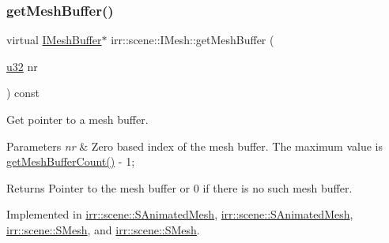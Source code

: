 \mbox{\label{classirr_1_1scene_1_1IMesh_a2cd1a04b396235101f426befba0c5b82}} 
\subsubsection{\texorpdfstring{get\+Mesh\+Buffer()}{getMeshBuffer()}\hspace{0.1cm}{\footnotesize\ttfamily [1/4]}}
{\footnotesize\ttfamily virtual \hyperlink{classirr_1_1scene_1_1IMeshBuffer}{I\+Mesh\+Buffer}$\ast$ irr\+::scene\+::\+I\+Mesh\+::get\+Mesh\+Buffer (\begin{DoxyParamCaption}\item[{\hyperlink{namespaceirr_a0416a53257075833e7002efd0a18e804}{u32}}]{nr }\end{DoxyParamCaption}) const\hspace{0.3cm}{\ttfamily [pure virtual]}}



Get pointer to a mesh buffer. 


\begin{DoxyParams}{Parameters}
{\em nr} & Zero based index of the mesh buffer. The maximum value is \hyperlink{classirr_1_1scene_1_1IMesh_a2ebed0bdae2d6537c36b0b7ac831edb8}{get\+Mesh\+Buffer\+Count()} -\/ 1; \\
\hline
\end{DoxyParams}
\begin{DoxyReturn}{Returns}
Pointer to the mesh buffer or 0 if there is no such mesh buffer. 
\end{DoxyReturn}


Implemented in \hyperlink{structirr_1_1scene_1_1SAnimatedMesh_ac186898d77ded042569a27609195d263}{irr\+::scene\+::\+S\+Animated\+Mesh}, \hyperlink{structirr_1_1scene_1_1SAnimatedMesh_ac186898d77ded042569a27609195d263}{irr\+::scene\+::\+S\+Animated\+Mesh}, \hyperlink{structirr_1_1scene_1_1SMesh_ad88b3ecd7e6f00e0ea5defb76ed205fc}{irr\+::scene\+::\+S\+Mesh}, and \hyperlink{structirr_1_1scene_1_1SMesh_ad88b3ecd7e6f00e0ea5defb76ed205fc}{irr\+::scene\+::\+S\+Mesh}.

\mbox{\label{classirr_1_1scene_1_1IMesh_a2cd1a04b396235101f426befba0c5b82}} 
